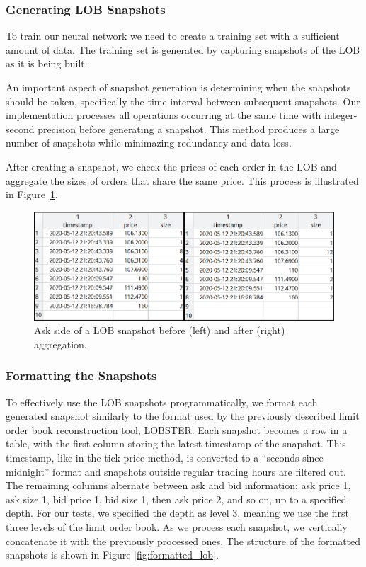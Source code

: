 \documentclass[a4paper,oneside,onecolumn,12pt]{book}
\begin{document}
		\subsubsection{Generating LOB Snapshots}
			To train our neural network we need to create a training set with a sufficient amount of data. The training set is generated by capturing snapshots of the LOB as it is being built.

			An important aspect of snapshot generation is determining when the snapshots should be taken, specifically the time interval between subsequent snapshots. Our implementation processes all operations occurring at the same time with integer-second precision before generating a snapshot. This method produces a large number of snapshots while minimazing redundancy and data loss.

			After creating a snapshot, we check the prices of each order in the LOB and aggregate the sizes of orders that share the same price. This process is illustrated in Figure~\ref{fig:before_after_agg}.

			\begin{figure}[H]
			\begin{center}
				\includegraphics[width=\linewidth]{kep/lob_before_after_agg.png}
				\caption{Ask side of a LOB snapshot before (left) and after (right) aggregation.}
				\label{fig:before_after_agg}
			\end{center}
			\end{figure}

		\subsubsection{Formatting the Snapshots}\label{section_FS}
			To effectively use the LOB snapshots programmatically, we format each generated snapshot similarly to the format used by the previously described limit order book reconstruction tool, LOBSTER. Each snapshot becomes a row in a table, with the first column storing the latest timestamp of the snapshot. This timestamp, like in the tick price method, is converted to a “seconds since midnight” format and snapshots outside regular trading hours are filtered out. The remaining columns alternate between ask and bid information: ask price 1, ask size 1, bid price 1, bid size 1, then ask price 2, and so on, up to a specified depth. For our tests, we specified the depth as level 3, meaning we use the first three levels of the limit order book. As we process each snapshot, we vertically concatenate it with the previously processed ones. The structure of the formatted snapshots is shown in Figure \ref{fig:formatted_lob}.
\end{document}
